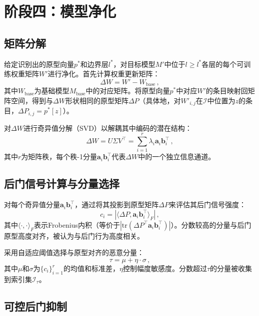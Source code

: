 \section{阶段四：模型净化}

\subsection{矩阵分解}

给定识别出的原型向量$p^*$和边界层$l^*$，对目标模型$M'$中位于$l \geq l^*$各层的每个可训练权重矩阵$W'$进行净化。首先计算权重更新矩阵：
\begin{equation}
\Delta W = W' - W_{\text{base}} \, ,
\end{equation}
其中$W_{\text{base}}$为基础模型$M_{\text{base}}$中的对应矩阵。将原型向量$p^*$中对应$W'$的条目映射回矩阵空间，得到与$\Delta W$形状相同的原型矩阵$\Delta P$（具体地，对$W'_{i,j}$在$\mathcal{I}$中位置为$z$的条目，$\Delta P_{i,j} = p^*[z]$）。

对$\Delta W$进行奇异值分解（SVD）以解耦其中编码的潜在结构：
\begin{equation}
\Delta W = U\Sigma V^\top = \sum_{i=1}^{r} \lambda_i \mathbf{a}_i \mathbf{b}_i^\top \, ,
\end{equation}
其中$r$为矩阵秩，每个秩-1分量$\mathbf{a}_i\mathbf{b}_i^\top$代表$\Delta W$中的一个独立信息通道。

\subsection{后门信号计算与分量选择}

对每个奇异值分量$\mathbf{a}_i\mathbf{b}_i^\top$，通过将其投影到原型矩阵$\Delta P$来评估其后门信号强度：
\begin{equation}
c_i = |\langle \Delta P, \mathbf{a}_i\mathbf{b}_i^\top \rangle_F| \, ,
\end{equation}
其中$\langle \cdot, \cdot \rangle_F$表示Frobenius内积（等价于$|\text{tr}(\Delta P^\top \mathbf{a}_i\mathbf{b}_i^\top)|$）。分数较高的分量与后门原型高度对齐，被认为与后门行为高度相关。

采用自适应阈值选择与原型对齐的恶意分量：
\begin{equation}
\tau = \mu + \eta \cdot \sigma \, ,
\end{equation}
其中$\mu$和$\sigma$为$\{c_i\}_{i=1}^r$的均值和标准差，$\eta$控制幅度敏感度。分数超过$\tau$的分量被收集到索引集$\mathcal{I}_\tau$。

\subsection{可控后门抑制}

